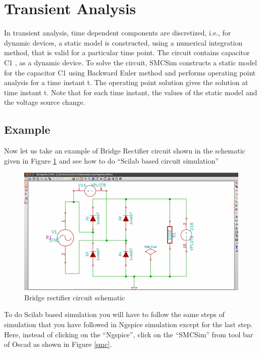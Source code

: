 \section {Transient Analysis}

In transient analysis, time dependent components are discretized, i.e., for dynamic devices, a static model is constructed, using a numerical integration method, that is valid for a particular time point. The circuit contains capacitor C1 , as a dynamic device. To solve the circuit, SMCSim constructs a static model for the capacitor C1 using Backward Euler method and performs operating point analysis for a time instant t. The operating point solution gives the solution at time instant t. Note that for each time instant, the values of the static model and the voltage source change. 

\subsection{Example}
Now let us take an example of Bridge Rectifier circuit shown in the schematic given in Figure \ref{bschem} and see how to do “Scilab based circuit simulation”


\begin{figure}[h]%
\begin{center}
\includegraphics[width=1\linewidth]{figures/SMCSim-B-Rectifier.png}%
\caption{Bridge rectifier circuit schematic}
\label{bschem}
\end{center}
\end{figure}

To do Scilab based simulation you will have to follow the same steps of simulation that you have followed in Ngspice simulation except for the last step. Here, instead of clicking on the “Ngspice”, click on the “SMCSim” from tool bar of Oscad as shown in Figure \ref{smc}.

